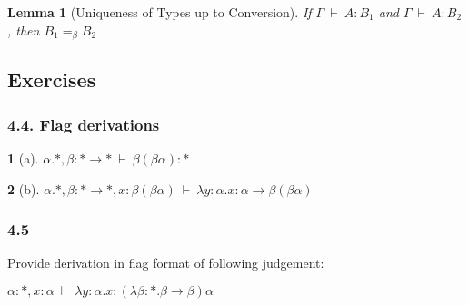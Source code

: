 \documentclass[12pt, a4paper]{article}
\newcommand{\deriv}{\ \vdash\ }
\newtheorem{lemma}{Lemma}[section]
\newtheorem*{exercise}{}
\begin{document}
\begin{lemma}[Uniqueness of Types up to Conversion]
If $\Gamma \deriv A : B_1$ and $\Gamma \deriv A : B_2$, then $B_1 =_\beta B_2$
\end{lemma}

\subsection{Exercises}
\subsubsection{4.4. Flag derivations}
\begin{exercise}[a]
    $\alpha . *, \beta : * \to * \deriv \beta(\beta\alpha) : *$
\end{exercise}
\begin{flagderiv}
    \assume{}{\alpha : *}{}
    \assume{}{\beta : * \to *}{}
\end{flagderiv}

\begin{exercise}[b]
    $\alpha . *, \beta : * \to *, x : \beta(\beta\alpha) \deriv \lambda y : \alpha . x : \alpha \to \beta(\beta\alpha)$
\end{exercise}
\begin{flagderiv}
    \assume{}{\alpha : *}{}
    \assume{}{\beta : * \to *}{}
\end{flagderiv}


\subsubsection{4.5}
Provide derivation in flag format of following judgement:

$\alpha : *, x : \alpha \deriv \lambda y : \alpha . x : (\lambda \beta : * . \beta \to \beta)\alpha$

\begin{flagderiv}
\end{flagderiv}




\end{document}
